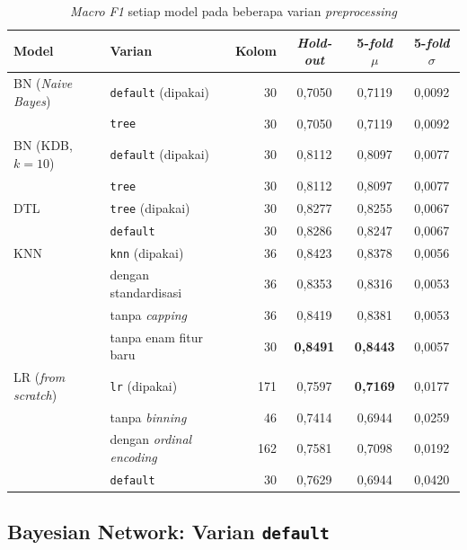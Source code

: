 \begin{table}[H]
	\centering
	\caption{\textit{Macro F1} setiap model pada beberapa varian \textit{preprocessing}}
	\label{tab:varian-holdout}
	\small
	\setlength{\tabcolsep}{4pt}
	\begin{tabular}{l l r c c c}
		\toprule
		\textbf{Model} & \textbf{Varian} & \textbf{Kolom} & \textbf{\textit{Hold-out}} & \textbf{5-\textit{fold} $\mu$} & \textbf{5-\textit{fold} $\sigma$} \\
		\midrule
		BN (\textit{Naive Bayes})  & \texttt{default} (dipakai) & 30 & 0,7050 & 0,7119 & 0,0092 \\
		                           & \texttt{tree}              & 30 & 0,7050 & 0,7119 & 0,0092 \\
		BN (KDB, $k=10$)           & \texttt{default} (dipakai) & 30 & 0,8112 & 0,8097 & 0,0077 \\
		                           & \texttt{tree}              & 30 & 0,8112 & 0,8097 & 0,0077 \\
		\midrule
		DTL                        & \texttt{tree} (dipakai)    & 30 & 0,8277 & 0,8255 & 0,0067 \\
		                           & \texttt{default}           & 30 & 0,8286 & 0,8247 & 0,0067 \\
		\midrule
		KNN                        & \texttt{knn} (dipakai)     & 36 & 0,8423 & 0,8378 & 0,0056 \\
		                           & dengan standardisasi       & 36 & 0,8353 & 0,8316 & 0,0053 \\
		                           & tanpa \textit{capping}     & 36 & 0,8419 & 0,8381 & 0,0053 \\
		                           & tanpa enam fitur baru      & 30 & \textbf{0,8491} & \textbf{0,8443} & 0,0057 \\
		\midrule
		LR (\textit{from scratch}) & \texttt{lr} (dipakai)      & 171 & 0,7597 & \textbf{0,7169} & 0,0177 \\
		                           & tanpa \textit{binning}     & 46 & 0,7414 & 0,6944 & 0,0259 \\
		                           & dengan \textit{ordinal encoding} & 162 & 0,7581 & 0,7098 & 0,0192 \\
		                           & \texttt{default}           & 30 & 0,7629 & 0,6944 & 0,0420 \\
		\bottomrule
	\end{tabular}
\end{table}

\subsection{Bayesian Network: Varian \texttt{default}}

